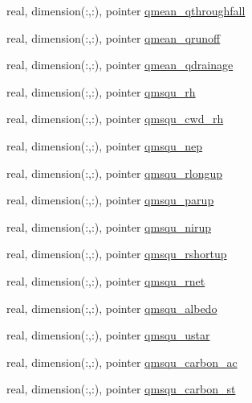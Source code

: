 \begin{DoxyCompactItemize}
\item 
real, dimension(\+:,\+:), pointer \hyperlink{structed__state__vars_1_1sitetype_a76a61509df727305910cf736d58efc66}{qmean\+\_\+qthroughfall}
\item 
real, dimension(\+:,\+:), pointer \hyperlink{structed__state__vars_1_1sitetype_afb8a6ae6bd6f403524d32c3eef14392f}{qmean\+\_\+qrunoff}
\item 
real, dimension(\+:,\+:), pointer \hyperlink{structed__state__vars_1_1sitetype_a7b98f613d417dbf9eba654e2cbbf5757}{qmean\+\_\+qdrainage}
\item 
real, dimension(\+:,\+:), pointer \hyperlink{structed__state__vars_1_1sitetype_a0af00ca0065044a5fe8d82bfb7e01d7d}{qmsqu\+\_\+rh}
\item 
real, dimension(\+:,\+:), pointer \hyperlink{structed__state__vars_1_1sitetype_af665dfccf5d3c301893e674ea9890ec7}{qmsqu\+\_\+cwd\+\_\+rh}
\item 
real, dimension(\+:,\+:), pointer \hyperlink{structed__state__vars_1_1sitetype_a03eb3206c6f57025e0a8dfd5160cf180}{qmsqu\+\_\+nep}
\item 
real, dimension(\+:,\+:), pointer \hyperlink{structed__state__vars_1_1sitetype_a991faa60863024b4d93d21f5a342bcf7}{qmsqu\+\_\+rlongup}
\item 
real, dimension(\+:,\+:), pointer \hyperlink{structed__state__vars_1_1sitetype_a54eca5044c42c16ce820a0b5c03991d2}{qmsqu\+\_\+parup}
\item 
real, dimension(\+:,\+:), pointer \hyperlink{structed__state__vars_1_1sitetype_a29719787fb8806663173ac6fa72bf25c}{qmsqu\+\_\+nirup}
\item 
real, dimension(\+:,\+:), pointer \hyperlink{structed__state__vars_1_1sitetype_a98f23c9d79c6c4545763b3946279172b}{qmsqu\+\_\+rshortup}
\item 
real, dimension(\+:,\+:), pointer \hyperlink{structed__state__vars_1_1sitetype_af187b4984260fe71c034085879ab57f5}{qmsqu\+\_\+rnet}
\item 
real, dimension(\+:,\+:), pointer \hyperlink{structed__state__vars_1_1sitetype_a4072560298a14103bb464e1716e0ca21}{qmsqu\+\_\+albedo}
\item 
real, dimension(\+:,\+:), pointer \hyperlink{structed__state__vars_1_1sitetype_a193b66cc1e9efecc3c57d784e75fa45a}{qmsqu\+\_\+ustar}
\item 
real, dimension(\+:,\+:), pointer \hyperlink{structed__state__vars_1_1sitetype_a0a6e2d745c96aa108aa3ffbf56d0e5a5}{qmsqu\+\_\+carbon\+\_\+ac}
\item 
real, dimension(\+:,\+:), pointer \hyperlink{structed__state__vars_1_1sitetype_a14d96a9ffe98a3ec1c019c8252e216f0}{qmsqu\+\_\+carbon\+\_\+st}

\end{DoxyCompactItemize}
